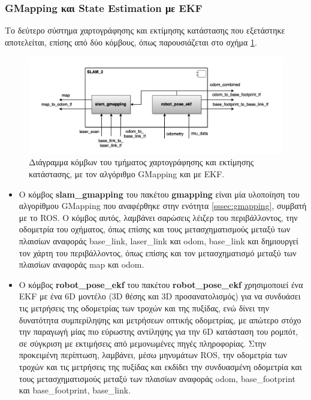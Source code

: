 \subsubsection{GMapping και State Estimation με EKF}
Το δεύτερο σύστημα χαρτογράφησης και εκτίμησης κατάστασης που εξετάστηκε αποτελείται, επίσης από δύο κόμβους, όπως παρουσιάζεται στο σχήμα \ref{fig:slam_2_component_diagram}.

\begin{figure}[!ht]
	\centering
	\includegraphics[width=\linewidth]{Chapters/Chapter4/Figures/slam_2_component_diagram.png}
	\caption{Διάγραμμα κόμβων του τμήματος χαρτογράφησης και εκτίμησης κατάστασης, με τον αλγόριθμο GMapping και με EKF.}
	\label{fig:slam_2_component_diagram}
\end{figure}

\begin{itemize}
		\item Ο κόμβος \textbf{slam{\_}gmapping} του πακέτου \textbf{gmapping} \cite{gmapping_package} είναι μία υλοποίηση του αλγορίθμου GMapping που αναφέρθηκε στην ενότητα \ref{sssec:gmapping}, συμβατή με το ROS. Ο κόμβος αυτός, λαμβάνει σαρώσεις λέιζερ του περιβάλλοντος, την οδομετρία του οχήματος, όπως επίσης και τους μετασχηματισμούς μεταξύ των πλαισίων αναφοράς base{\_}link, laser{\_}link και odom, base{\_}link και δημιουργεί τον χάρτη του περιβάλλοντος, όπως επίσης και τον μετασχηματισμό μεταξύ των πλαισίων αναφοράς map και odom.
		\item Ο κόμβος \textbf{robot{\_}pose{\_}ekf} του πακέτου \textbf{robot{\_}pose{\_}ekf} \cite{robot_pose_ekf} χρησιμοποιεί ένα EKF με ένα 6D μοντέλο (3D θέσης και 3D προσανατολισμός) για να συνδυάσει τις μετρήσεις της οδομετρίας των τροχών και της πυξίδας, ενώ δίνει την δυνατότητα συμπερίληψης και μετρήσεων οπτικής οδομετρίας, με απώτερο στόχο την παραγωγή μίας πιο εύρωστης αντίληψης για την 6D κατάσταση του ρομπότ, σε σύγκριση με εκτιμήσεις από μεμονωμένες πηγές πληροφορίας. Στην προκειμένη περίπτωση, λαμβάνει, μέσω μηνυμάτων ROS, την οδομετρία των τροχών και τις μετρήσεις της πυξίδας και εκδίδει την συνδυασμένη οδομετρία και τους μετασχηματισμούς μεταξύ των πλαισίων αναφοράς odom, base{\_}footprint και base{\_}footprint, base{\_}link.

\end{itemize}

